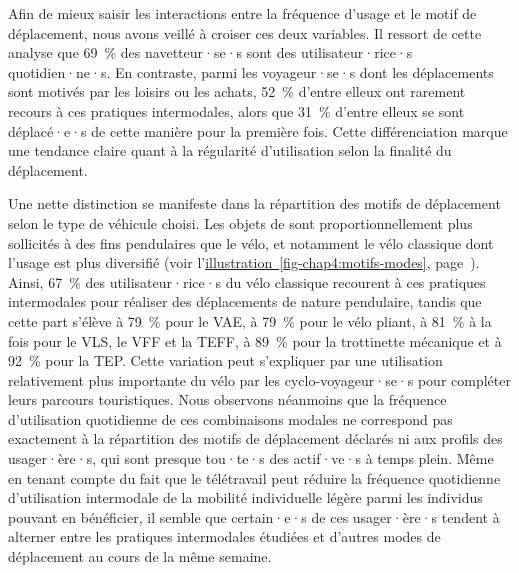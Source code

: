 \begin{refsegment}
Afin de mieux saisir les interactions entre la fréquence d'usage et le motif de déplacement, nous avons veillé à croiser ces deux variables. Il ressort de cette analyse que 69~\% des navetteur·se·s sont des utilisateur·rice·s quotidien·ne·s. En contraste, parmi les voyageur·se·s dont les déplacements sont motivés par les loisirs ou les achats, 52~\% d'entre elleux ont rarement recours à ces pratiques intermodales, alors que 31~\% d'entre elleux se sont déplacé·e·s de cette manière pour la première fois. Cette différenciation marque une tendance claire quant à la régularité d'utilisation selon la finalité du déplacement.%

Une nette distinction se manifeste dans la répartition des motifs de déplacement selon le type de véhicule choisi. Les objets de  sont proportionnellement plus sollicités à des fins pendulaires que le vélo, et notamment le vélo classique dont l'usage est plus diversifié (voir l'\hyperref[fig-chap4:motifs-modes]{illustration~\ref{fig-chap4:motifs-modes}}, page~\pageref{fig-chap4:motifs-modes}). Ainsi, 67~\% des utilisateur·rice·s du vélo classique recourent à ces pratiques intermodales pour réaliser des déplacements de nature pendulaire, tandis que cette part s'élève à 79~\% pour le \acrshort{VAE}, à 79~\% pour le vélo pliant, à 81~\% à la fois pour le \acrshort{VLS}, le \acrshort{VFF} et la \acrshort{TEFF}, à 89~\% pour la trottinette mécanique et à 92~\% pour la \acrshort{TEP}. Cette variation peut s'expliquer par une utilisation relativement plus importante du vélo par les cyclo-voyageur·se·s pour compléter leurs parcours touristiques. Nous observons néanmoins que la fréquence d'utilisation quotidienne de ces combinaisons modales ne correspond pas exactement à la répartition des motifs de déplacement déclarés ni aux profils des usager·ère·s, qui sont presque tou·te·s des actif·ve·s à temps plein. Même en tenant compte du fait que le télétravail peut réduire la fréquence quotidienne d'utilisation intermodale de la mobilité individuelle légère parmi les individus pouvant en bénéficier, il semble que certain·e·s de ces usager·ère·s tendent à alterner entre les pratiques intermodales étudiées et d'autres modes de déplacement au cours de la même semaine.%


\end{refsegment}
